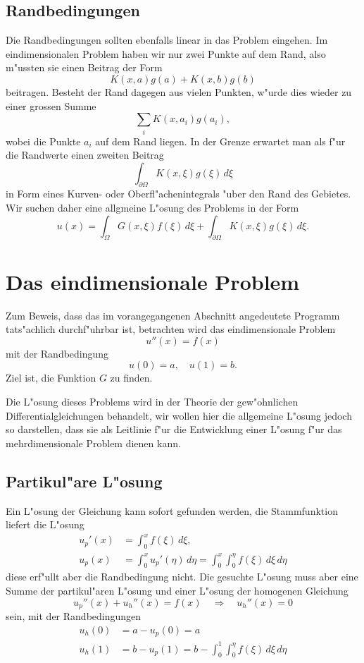 \subsection{Randbedingungen}
Die Randbedingungen sollten ebenfalls linear in das Problem eingehen.
Im eindimensionalen Problem haben wir nur zwei Punkte auf dem Rand,
also m"ussten sie einen Beitrag der Form
\[
K(x,a) g(a) + K(x,b)g(b)
\]
beitragen. Besteht der Rand dagegen aus vielen Punkten, w"urde dies
wieder zu einer grossen Summe
\[
\sum_{i}K(x,a_i)g(a_i),
\]
wobei die Punkte $a_i$ auf dem Rand liegen. In der Grenze erwartet man
als f"ur die Randwerte einen zweiten Beitrag
\[
\int_{\partial\Omega}K(x,\xi)g(\xi)\,d\xi
\]
in Form eines Kurven- oder Oberfl"achenintegrals "uber den Rand des
Gebietes.
Wir suchen daher eine allgmeine L"osung des Problems in der Form
\begin{equation}
u(x)=\int_{\Omega} G(x,\xi)f(\xi)\,d\xi + \int_{\partial\Omega} K(x,\xi)g(\xi)\,d\xi.
\label{greenformula}
\end{equation}

\section{Das eindimensionale Problem}
Zum Beweis, dass das im vorangegangenen Abschnitt angedeutete Programm 
tats"achlich durchf"uhrbar ist,
betrachten wird das eindimensionale Problem
\[
u''(x)=f(x)
\]
mit der Randbedingung
\[
u(0)=a,\quad u(1)=b.
\]
Ziel ist, die Funktion $G$ zu finden.

Die L"osung dieses Problems wird in der Theorie der gew"ohnlichen
Differential\-gleichungen behandelt, wir wollen hier die allgemeine
L"osung jedoch so darstellen, dass sie als Leitlinie f"ur die
Entwicklung einer L"osung f"ur das mehrdimensionale Problem dienen
kann.
\subsection{Partikul"are L"osung}
Ein L"osung der Gleichung kann sofort gefunden werden, die Stammfunktion
liefert die L"osung
\begin{align*}
u_p'(x)&=\int_0^xf(\xi)\,d\xi,
\\
u_p(x)&=\int_0^xu_p'(\eta)\,d\eta=\int_0^x\int_0^\eta f(\xi)\,d\xi\,d\eta
\end{align*}
diese erf"ullt aber die Randbedingung nicht.
Die gesuchte L"osung muss aber eine Summe der partikul"aren L"osung 
und einer L"osung der homogenen Gleichung
\[
u_p''(x) + u_h''(x)=f(x)\quad\Rightarrow\quad u_h''(x)=0
\]
sein, mit der Randbedingungen
\begin{align*}
u_h(0)&=a-u_p(0)=a\\
u_h(1)&=b-u_p(1)=b-\int_0^1\int_0^\eta f(\xi)\,d\xi\,d\eta
\end{align*}

